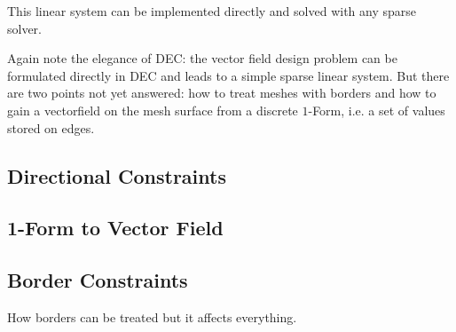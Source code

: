 This linear system can be implemented directly and solved with any sparse solver.

Again note the elegance of DEC: the vector field design problem can be formulated directly in DEC and leads to a simple sparse linear system. But there are two points not yet answered: how to treat meshes with borders and how to gain a vectorfield on the mesh surface from a discrete $1$-Form, i.e. a set of values stored on edges.


\subsection{Directional Constraints}


\subsection{1-Form to Vector Field}

\subsection{Border Constraints}
How borders can be treated but it affects everything.